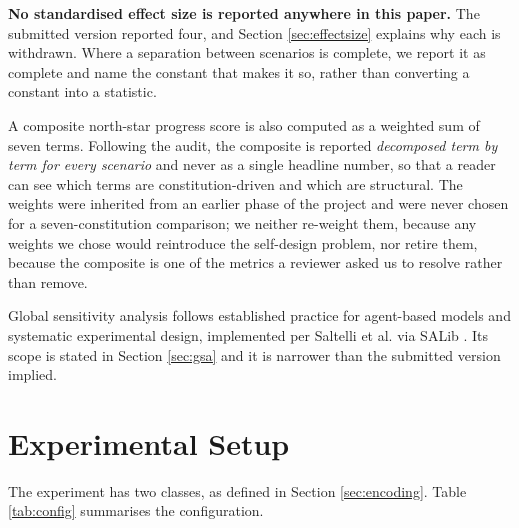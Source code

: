 \documentclass{ieeeaccess}
\begin{document}
\textbf{No standardised effect size is reported anywhere in this paper.}
The submitted version reported four, and Section \ref{sec:effectsize}
explains why each is withdrawn. Where a separation between scenarios is
complete, we report it as complete and name the constant that makes it
so, rather than converting a constant into a statistic.

A composite north-star progress score is also computed as a weighted sum
of seven terms. Following the audit, the composite is reported
\emph{decomposed term by term for every scenario} and never as a single
headline number, so that a reader can see which terms are
constitution-driven and which are structural. The weights were inherited
from an earlier phase of the project and were never chosen for a
seven-constitution comparison; we neither re-weight them, because any
weights we chose would reintroduce the self-design problem, nor retire
them, because the composite is one of the metrics a reviewer asked us to
resolve rather than remove.

Global sensitivity analysis follows established practice for agent-based
models \cite{tenbroeke2016sensitivity,lorscheid2012opening} and
systematic experimental design, implemented per Saltelli et al.
\cite{saltelli2008global} via SALib \cite{herman2017salib}. Its scope is
stated in Section \ref{sec:gsa} and it is narrower than the submitted
version implied.

\section{Experimental Setup}
\label{sec:setup}

The experiment has two classes, as defined in Section
\ref{sec:encoding}. Table \ref{tab:config} summarises the configuration.
\end{document}
